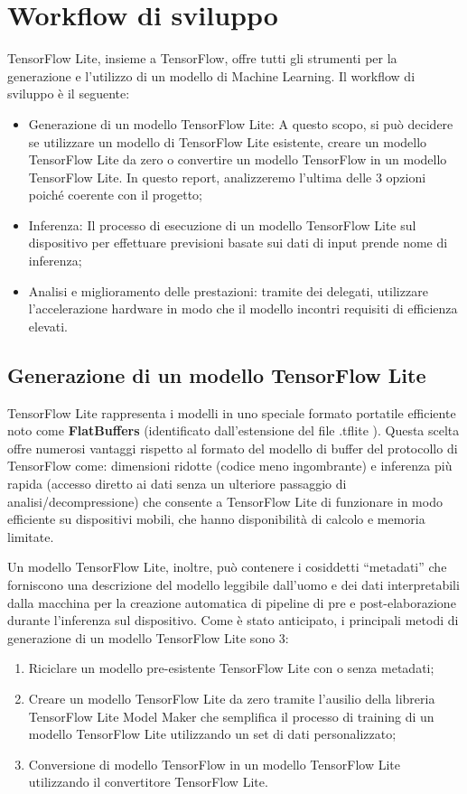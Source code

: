 \section{Workflow di sviluppo}
TensorFlow Lite, insieme a TensorFlow, offre tutti gli strumenti per la generazione e l’utilizzo di un modello di Machine Learning. Il workflow di
sviluppo è il seguente:
\begin{itemize}
    \item Generazione di un modello TensorFlow Lite: A questo scopo, si può decidere se utilizzare un modello di TensorFlow Lite esistente, creare un
    modello TensorFlow Lite da zero o convertire un modello TensorFlow in un modello TensorFlow Lite. In questo report, analizzeremo l’ultima delle 3
    opzioni poiché coerente con il progetto;
    \item Inferenza: Il processo di esecuzione di un modello TensorFlow Lite sul dispositivo per effettuare previsioni basate sui dati di input prende
    nome di inferenza;
    \item Analisi e miglioramento delle prestazioni: tramite dei delegati, utilizzare l’accelerazione hardware in modo che il modello incontri requisiti
    di efficienza elevati.
\end{itemize}

\subsection{Generazione di un modello TensorFlow Lite}
TensorFlow Lite rappresenta i modelli in uno speciale formato portatile efficiente noto come \textbf{FlatBuffers} (identificato dall'estensione del file .tflite ).
Questa scelta offre numerosi vantaggi rispetto al formato del modello di buffer del protocollo di TensorFlow come: dimensioni ridotte
(codice meno ingombrante) e inferenza più rapida (accesso diretto ai dati senza un ulteriore passaggio di analisi/decompressione) che consente a TensorFlow
Lite di funzionare in modo efficiente su dispositivi mobili, che hanno disponibilità di calcolo e memoria limitate.

Un modello TensorFlow Lite, inoltre, può contenere i cosiddetti “metadati” che forniscono una descrizione del modello leggibile dall’uomo e dei dati
interpretabili dalla macchina per la creazione automatica di pipeline di pre e post-elaborazione durante l’inferenza sul dispositivo.
Come è stato anticipato, i principali metodi di generazione di un modello TensorFlow Lite sono 3: 
\begin{enumerate}
    \item Riciclare un modello pre-esistente TensorFlow Lite con o senza metadati;
    \item Creare un modello TensorFlow Lite da zero tramite l’ausilio della libreria TensorFlow Lite Model Maker che semplifica il processo di training di
    un modello TensorFlow Lite utilizzando un set di dati personalizzato;
    \item Conversione di modello TensorFlow in un modello TensorFlow Lite utilizzando il convertitore TensorFlow Lite.
\end{enumerate}

